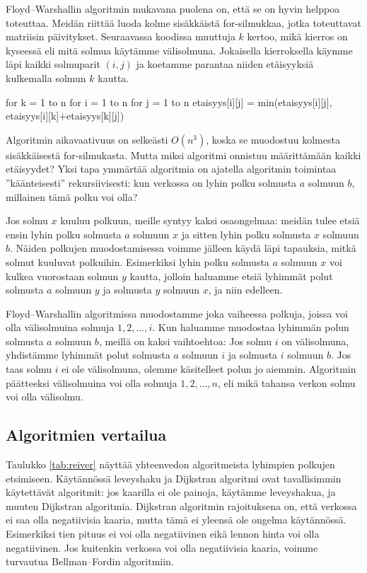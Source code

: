 Floyd–Warshallin algoritmin mukavana puolena on,
että se on hyvin helppoa toteuttaa.
Meidän riittää luoda kolme sisäkkäistä for-silmukkaa,
jotka toteuttavat matriisin päivitykset.
Seuraavassa koodissa muuttuja $k$ kertoo,
mikä kierros on kyseessä eli mitä solmua käytämme välisolmuna.
Jokaisella kierroksella käymme läpi kaikki solmuparit $(i,j)$
ja koetamme parantaa niiden etäisyyksiä kulkemalla solmun $k$ kautta.

\begin{code}
for k = 1 to n
    for i = 1 to n
        for j = 1 to n
            etaisyys[i][j] = min(etaisyys[i][j],
                                   etaisyys[i][k]+etaisyys[k][j])
\end{code}

Algoritmin aikavaativuus on selkeästi $O(n^3)$,
koska se muodostuu kolmesta sisäkkäisestä for-silmukasta.
Mutta miksi algoritmi onnistuu määrittämään kaikki etäisyydet?
Yksi tapa ymmärtää algoritmia on
ajatella algoritmin toimintaa ''käänteisesti'' rekursiivisesti:
kun verkossa on lyhin polku solmusta $a$ solmuun $b$,
millainen tämä polku voi olla?

Jos solmu $x$ kuuluu polkuun, meille syntyy kaksi osaongelmaa:
meidän tulee etsiä ensin lyhin polku solmusta $a$ solmuun $x$
ja sitten lyhin polku solmusta $x$ solmuun $b$.
Näiden polkujen muodostamisessa voimme jälleen käydä läpi tapauksia,
mitkä solmut kuuluvat polkuihin.
Esimerkiksi lyhin polku solmusta $a$ solmuun $x$
voi kulkea vuorostaan solmun $y$ kautta,
jolloin haluamme etsiä lyhimmät polut solmusta $a$ solmuun $y$
ja solmusta $y$ solmuun $x$, ja niin edelleen.

Floyd–Warshallin algoritmissa muodostamme joka vaiheessa
polkuja, joissa voi olla välisolmuina solmuja $1,2,\dots,i$.
Kun haluamme muodostaa lyhimmän polun solmusta $a$ solmuun $b$,
meillä on kaksi vaihtoehtoa:
Jos solmu $i$ on välisolmuna, yhdistämme lyhimmät polut
solmusta $a$ solmuun $i$ ja solmusta $i$ solmuun $b$.
Jos taas solmu $i$ ei ole välisolmuna, olemme käsitelleet
polun jo aiemmin.
Algoritmin päätteeksi välisolmuina voi olla solmuja $1,2,\dots,n$,
eli mikä tahansa verkon solmu voi olla välisolmu.

\subsection{Algoritmien vertailua}

Taulukko \ref{tab:reiver} näyttää yhteenvedon algoritmeista
lyhimpien polkujen etsimiseen.
Käytännössä leveyshaku ja Dijkstran algoritmi ovat
tavallisimmin käytettävät algoritmit:
jos kaarilla ei ole painoja, käytämme leveyshakua,
ja muuten Dijkstran algoritmia.
Dijkstran algoritmin rajoituksena on,
että verkossa ei saa olla negatiivisia kaaria,
mutta tämä ei yleensä ole ongelma käytännössä.
Esimerkiksi tien pituus ei voi olla negatiivinen
eikä lennon hinta voi olla negatiivinen.
Jos kuitenkin verkossa voi olla negatiivisia kaaria,
voimme turvautua Bellman–Fordin algoritmiin.

